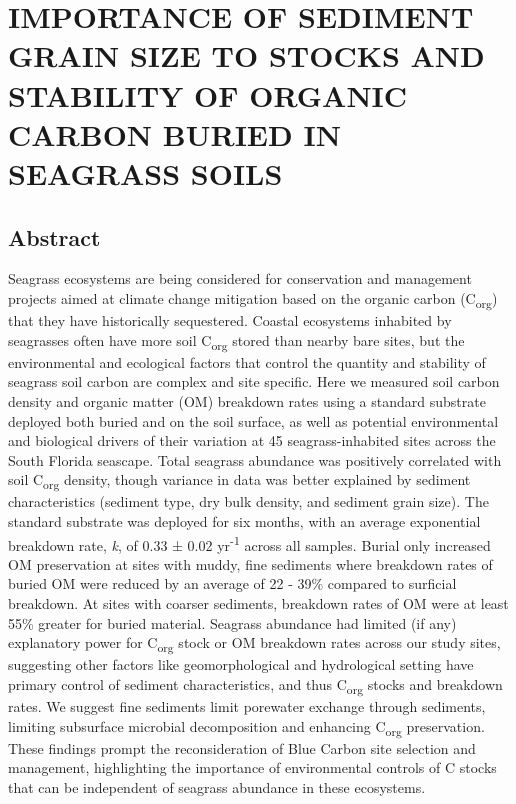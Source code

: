\chapter{IMPORTANCE OF SEDIMENT GRAIN SIZE TO STOCKS AND STABILITY OF ORGANIC CARBON BURIED IN SEAGRASS SOILS}		\label{another chapter}


\section{Abstract}
Seagrass ecosystems are being considered for conservation and management projects aimed at climate change mitigation based on the organic carbon (C\textsubscript{org}) that they have historically sequestered. Coastal ecosystems inhabited by seagrasses often have more soil C\textsubscript{org} stored than nearby bare sites, but the environmental and ecological factors that control the quantity and stability of seagrass soil carbon are complex and site specific. Here we measured soil carbon density and organic matter (OM) breakdown rates using a standard substrate deployed both buried and on the soil surface, as well as potential environmental and biological drivers of their variation at 45 seagrass-inhabited sites across the South Florida seascape. Total seagrass abundance was positively correlated with soil C\textsubscript{org} density, though variance in data was better explained by sediment characteristics (sediment type, dry bulk density, and sediment grain size). The standard substrate was deployed for six months, with an average exponential breakdown rate, \textit{k}, of 0.33 ± 0.02 yr\textsuperscript{-1} across all samples. Burial only increased OM preservation at sites with muddy, fine sediments where breakdown rates of buried OM were reduced by an average of 22 - 39\% compared to surficial breakdown. At sites with coarser sediments, breakdown rates of OM were at least 55\% greater for buried material. Seagrass abundance had limited (if any) explanatory power for C\textsubscript{org} stock or OM breakdown rates across our study sites, suggesting other factors like geomorphological and hydrological setting have primary control of sediment characteristics, and thus C\textsubscript{org} stocks and breakdown rates. We suggest fine sediments limit porewater exchange through sediments, limiting subsurface microbial decomposition and enhancing C\textsubscript{org} preservation. These findings prompt the reconsideration of Blue Carbon site selection and management, highlighting the importance of environmental controls of C stocks that can be independent of seagrass abundance in these ecosystems.

